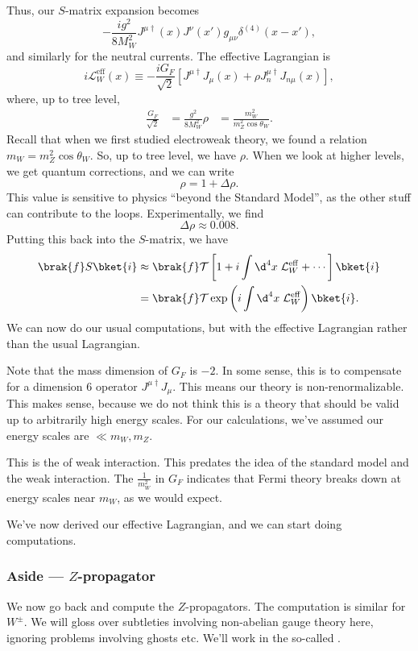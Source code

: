 \documentclass[a4paper]{article}
\begin{document}
Thus, our $S$-matrix expansion becomes
\[
  -\frac{ig^2}{8 M_W^2} J^{\mu \dagger}(x) J^\nu(x') g_{\mu\nu} \delta^{(4)}(x - x'),
\]
and similarly for the neutral currents. The effective Lagrangian is
\[
  i \mathcal{L}_W^{\mathrm{eff}} (x) \equiv - \frac{i G_F}{\sqrt{2}} \left[J^{\mu \dagger} J_\mu(x) + \rho J_n^{\mu\dagger} J_{n\mu} (x)\right],
\]
where, up to tree level,
\begin{align*}
  \frac{G_F}{\sqrt{2}} &= \frac{g^2}{8 M_W^2} %
  \rho &= \frac{m_W^2}{m_Z^2 \cos \theta_W}.
\end{align*}
Recall that when we first studied electroweak theory, we found a relation $m_W= m_Z^2 \cos \theta_W$. So, up to tree level, we have $\rho$. When we look at higher levels, we get quantum corrections, and we can write
\[
  \rho = 1 + \Delta \rho.
\]
This value is sensitive to physics ``beyond the Standard Model'', as the other stuff can contribute to the loops. Experimentally, we find
\[
  \Delta \rho \approx 0.008.
\]
Putting this back into the $S$-matrix, we have
\begin{align*}
  \brak{f}S\bket{i} &\approx \brak{f} \mathcal{T} \left[1 + i \int \d^4 x\; \mathcal{L}_W^{\mathrm{eff}} + \cdots\right] \bket{i}\\
  &= \brak{f} \mathcal{T} \exp\left(i \int \d^4 x\; \mathcal{L}_W^{\mathrm{eff}}\right)\bket{i}.
\end{align*}
We can now do our usual computations, but with the effective Lagrangian rather than the usual Lagrangian.

Note that the mass dimension of $G_F$ is $-2$. In some sense, this is to compensate for a dimension $6$ operator $J^{\mu\dagger}J_\mu$. This means our theory is non-renormalizable. This makes sense, because we do not think this is a theory that should be valid up to arbitrarily high energy scales. For our calculations, we've assumed our energy scales are $\ll m_W, m_Z$.

This is the  of weak interaction. This predates the idea of the standard model and the weak interaction. The $\frac{1}{m_W^2}$ in $G_F$ indicates that Fermi theory breaks down at energy scales near $m_W$, as we would expect.

We've now derived our effective Lagrangian, and we can start doing computations.

\subsubsection*{Aside --- $Z$-propagator}
We now go back and compute the $Z$-propagators. The computation is similar for $W^{\pm}$. We will gloss over subtleties involving non-abelian gauge theory here, ignoring problems involving ghosts etc. We'll work in the so-called .
\end{document}
